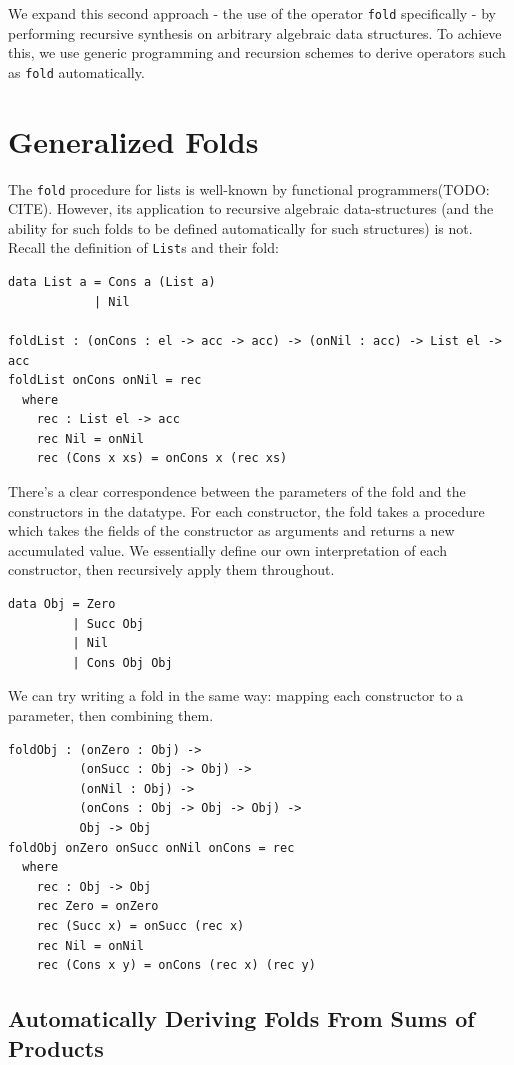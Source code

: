 \documentclass[acmsmall]{acmart}
\begin{document}
We expand this second approach - the use of the operator \texttt{fold} specifically - by performing recursive synthesis on arbitrary algebraic data structures. To achieve this, we use generic programming and recursion schemes to derive operators such as \texttt{fold} automatically.

\section{Generalized Folds}

The \texttt{fold} procedure for lists is well-known by functional programmers(TODO: CITE). However, its application to recursive algebraic data-structures (and the ability for such folds to be defined automatically for such structures) is not. Recall the definition of \texttt{List}s and their fold:

\begin{verbatim}
data List a = Cons a (List a)
            | Nil

foldList : (onCons : el -> acc -> acc) -> (onNil : acc) -> List el -> acc
foldList onCons onNil = rec
  where
    rec : List el -> acc
    rec Nil = onNil
    rec (Cons x xs) = onCons x (rec xs)
\end{verbatim}

There's a clear correspondence between the parameters of the fold and the constructors in the datatype. For each constructor, the fold takes a procedure which takes the fields of the constructor as arguments and returns a new accumulated value. We essentially define our own interpretation of each constructor, then recursively apply them throughout.

\begin{verbatim}
data Obj = Zero
         | Succ Obj
         | Nil
         | Cons Obj Obj
\end{verbatim}

We can try writing a fold in the same way: mapping each constructor to a parameter, then combining them.

\begin{Verbatim}
foldObj : (onZero : Obj) ->
          (onSucc : Obj -> Obj) ->
          (onNil : Obj) ->
          (onCons : Obj -> Obj -> Obj) ->
          Obj -> Obj
foldObj onZero onSucc onNil onCons = rec
  where
    rec : Obj -> Obj
    rec Zero = onZero
    rec (Succ x) = onSucc (rec x)
    rec Nil = onNil
    rec (Cons x y) = onCons (rec x) (rec y)
\end{Verbatim}

\subsection{Automatically Deriving Folds From Sums of Products}
\end{document}
